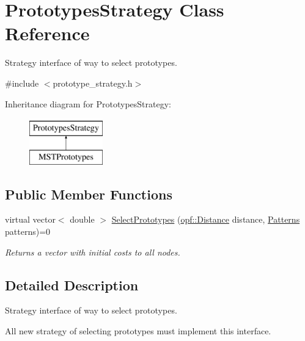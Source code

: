 \hypertarget{classPrototypesStrategy}{\section{Prototypes\+Strategy Class Reference}
\label{classPrototypesStrategy}
}


Strategy interface of way to select prototypes.  




{\ttfamily \#include $<$prototype\+\_\+strategy.\+h$>$}

Inheritance diagram for Prototypes\+Strategy\+:\begin{figure}[H]
\begin{center}
\leavevmode
\includegraphics[height=2.000000cm]{classPrototypesStrategy}
\end{center}
\end{figure}
\subsection*{Public Member Functions}
\begin{DoxyCompactItemize}
\item 
virtual vector$<$ double $>$ \hyperlink{classPrototypesStrategy_a0422be14bb6be39a2d06112daf7043c1}{Select\+Prototypes} (\hyperlink{namespaceopf_a61631393754e0aa6aaeacf0767b2b419}{opf\+::\+Distance} distance, \hyperlink{classPatterns}{Patterns} patterns)=0
\begin{DoxyCompactList}\small\item\em Returns a vector with initial costs to all nodes. \end{DoxyCompactList}\end{DoxyCompactItemize}


\subsection{Detailed Description}
Strategy interface of way to select prototypes. 

All new strategy of selecting prototypes must implement this interface. 

